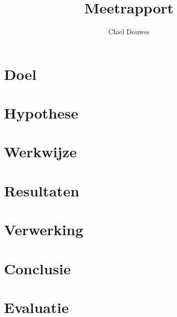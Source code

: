 \documentclass[11pt]{article}
\title{Meetrapport}
\author{Chiel Douwes}
\begin{document}
    \maketitle


    \section{Doel}\label{sec:doel}


    \section{Hypothese}\label{sec:hypothese}


    \section{Werkwijze}\label{sec:werkwijze}


    \section{Resultaten}\label{sec:resultaten}


    \section{Verwerking}\label{sec:verwerking}


    \section{Conclusie}\label{sec:conclusie}


    \section{Evaluatie}\label{sec:evaluatie}
\end{document}
